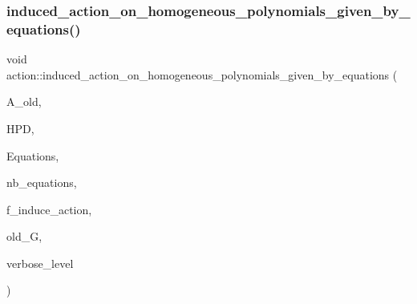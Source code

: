 \mbox{\label{classaction_a8f8df8dabfaa711297c20d44a2c1946a}} 
\subsubsection{\texorpdfstring{induced\+\_\+action\+\_\+on\+\_\+homogeneous\+\_\+polynomials\+\_\+given\+\_\+by\+\_\+equations()}{induced\_action\_on\_homogeneous\_polynomials\_given\_by\_equations()}}
{\footnotesize\ttfamily void action\+::induced\+\_\+action\+\_\+on\+\_\+homogeneous\+\_\+polynomials\+\_\+given\+\_\+by\+\_\+equations (\begin{DoxyParamCaption}\item[{\mbox{\hyperlink{classaction}{action}} $\ast$}]{A\+\_\+old,  }\item[{\mbox{\hyperlink{classhomogeneous__polynomial__domain}{homogeneous\+\_\+polynomial\+\_\+domain}} $\ast$}]{H\+PD,  }\item[{\mbox{\hyperlink{galois_8h_a09fddde158a3a20bd2dcadb609de11dc}{I\+NT}} $\ast$}]{Equations,  }\item[{\mbox{\hyperlink{galois_8h_a09fddde158a3a20bd2dcadb609de11dc}{I\+NT}}}]{nb\+\_\+equations,  }\item[{\mbox{\hyperlink{galois_8h_a09fddde158a3a20bd2dcadb609de11dc}{I\+NT}}}]{f\+\_\+induce\+\_\+action,  }\item[{\mbox{\hyperlink{classsims}{sims}} $\ast$}]{old\+\_\+G,  }\item[{\mbox{\hyperlink{galois_8h_a09fddde158a3a20bd2dcadb609de11dc}{I\+NT}}}]{verbose\+\_\+level }\end{DoxyParamCaption})}

\mbox{\label{classaction_a2eb6058853cffc4c099099e07ecbe612}} 
